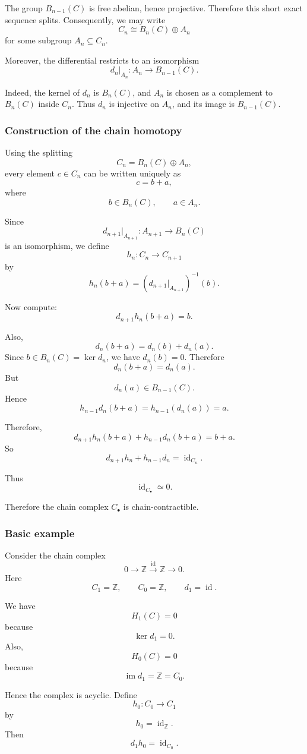 \documentclass[12pt,a4paper]{article}
\theoremstyle{notespace}
\begin{document}
The group \(B_{n-1}(C)\) is free abelian, hence projective. Therefore this short exact sequence splits. Consequently, we may write
\[
C_n\cong B_n(C)\oplus A_n
\]
for some subgroup \(A_n\subseteq C_n\).

Moreover, the differential restricts to an isomorphism
\[
d_n|_{A_n}\colon A_n\to B_{n-1}(C).
\]

Indeed, the kernel of \(d_n\) is \(B_n(C)\), and \(A_n\) is chosen as a complement to \(B_n(C)\) inside \(C_n\). Thus \(d_n\) is injective on \(A_n\), and its image is \(B_{n-1}(C)\).

\subsubsection{Construction of the chain homotopy}

Using the splitting
\[
C_n=B_n(C)\oplus A_n,
\]
every element \(c\in C_n\) can be written uniquely as
\[
c=b+a,
\]
where
\[
b\in B_n(C),
\qquad
a\in A_n.
\]

Since
\[
d_{n+1}|_{A_{n+1}}\colon A_{n+1}\to B_n(C)
\]
is an isomorphism, we define
\[
h_n\colon C_n\to C_{n+1}
\]
by
\[
h_n(b+a)=\left(d_{n+1}|_{A_{n+1}}\right)^{-1}(b).
\]

Now compute:
\[
d_{n+1}h_n(b+a)=b.
\]

Also,
\[
d_n(b+a)=d_n(b)+d_n(a).
\]
Since \(b\in B_n(C)=\ker d_n\), we have \(d_n(b)=0\). Therefore
\[
d_n(b+a)=d_n(a).
\]
But
\[
d_n(a)\in B_{n-1}(C).
\]
Hence
\[
h_{n-1}d_n(b+a)
=
h_{n-1}(d_n(a))
=
a.
\]

Therefore,
\[
d_{n+1}h_n(b+a)+h_{n-1}d_n(b+a)
=
b+a.
\]
So
\[
d_{n+1}h_n+h_{n-1}d_n
=
\operatorname{id}_{C_n}.
\]

Thus
\[
\operatorname{id}_{C_\bullet}\simeq 0.
\]

Therefore the chain complex \(C_\bullet\) is chain-contractible.

\subsubsection{Basic example}

Consider the chain complex
\[
0\to \mathbb Z
\xrightarrow{\operatorname{id}}
\mathbb Z
\to 0.
\]
Here
\[
C_1=\mathbb Z,
\qquad
C_0=\mathbb Z,
\qquad
d_1=\operatorname{id}.
\]

We have
\[
H_1(C)=0
\]
because
\[
\ker d_1=0.
\]
Also,
\[
H_0(C)=0
\]
because
\[
\operatorname{im} d_1=\mathbb Z=C_0.
\]

Hence the complex is acyclic. Define
\[
h_0\colon C_0\to C_1
\]
by
\[
h_0=\operatorname{id}_{\mathbb Z}.
\]
Then
\[
d_1 h_0=\operatorname{id}_{C_0}.
\]
\end{document}
